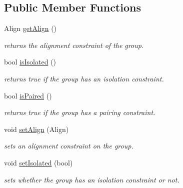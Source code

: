 \subsection*{Public Member Functions}
\begin{DoxyCompactItemize}
\item 
\mbox{\label{class_open_chams_1_1_group_a7cff0c4a6957f23fb1ea4598f4b8a0b8}} 
Align \mbox{\hyperlink{class_open_chams_1_1_group_a7cff0c4a6957f23fb1ea4598f4b8a0b8}{get\+Align}} ()
\begin{DoxyCompactList}\small\item\em returns the alignment constraint of the group. \end{DoxyCompactList}\item 
\mbox{\label{class_open_chams_1_1_group_ab5ae4a4550c418c974ff6e59967eeec2}} 
bool \mbox{\hyperlink{class_open_chams_1_1_group_ab5ae4a4550c418c974ff6e59967eeec2}{is\+Isolated}} ()
\begin{DoxyCompactList}\small\item\em returns true if the group has an isolation constraint. \end{DoxyCompactList}\item 
\mbox{\label{class_open_chams_1_1_group_aee0abf07a6e9d41f511c648e6eaecea3}} 
bool \mbox{\hyperlink{class_open_chams_1_1_group_aee0abf07a6e9d41f511c648e6eaecea3}{is\+Paired}} ()
\begin{DoxyCompactList}\small\item\em returns true if the group has a pairing constraint. \end{DoxyCompactList}\item 
void \mbox{\hyperlink{class_open_chams_1_1_group_a9fc27b2bc4da99c723102153c4fbf1c0}{set\+Align}} (Align)
\begin{DoxyCompactList}\small\item\em sets an alignment constraint on the group. \end{DoxyCompactList}\item 
void \mbox{\hyperlink{class_open_chams_1_1_group_abefcd8ede34b508fe7d42428a618cb02}{set\+Isolated}} (bool)
\begin{DoxyCompactList}\small\item\em sets whether the group has an isolation constraint or not. \end{DoxyCompactList}\item 

\end{DoxyCompactItemize}
